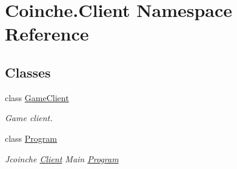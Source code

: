 \hypertarget{namespace_coinche_1_1_client}{}\section{Coinche.\+Client Namespace Reference}
\label{namespace_coinche_1_1_client}
\subsection*{Classes}
\begin{DoxyCompactItemize}
\item 
class \hyperlink{class_coinche_1_1_client_1_1_game_client}{Game\+Client}
\begin{DoxyCompactList}\small\item\em Game client. \end{DoxyCompactList}\item 
class \hyperlink{class_coinche_1_1_client_1_1_program}{Program}
\begin{DoxyCompactList}\small\item\em Jcoinche \hyperlink{namespace_coinche_1_1_client}{Client} Main \hyperlink{class_coinche_1_1_client_1_1_program}{Program} \end{DoxyCompactList}\end{DoxyCompactItemize}

